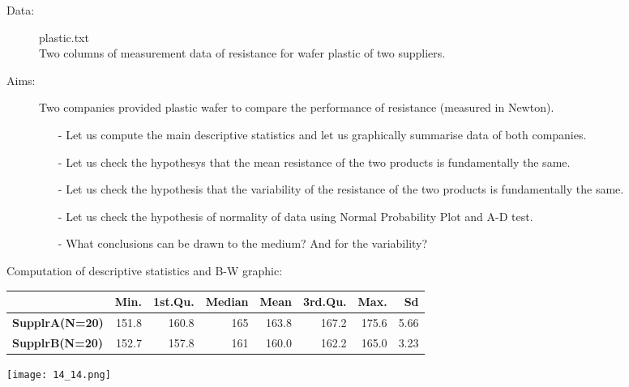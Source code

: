\begin{frame} 
  \begin{description}
    \item[Data:] plastic.txt\\ 
      Two columns of measurement data of resistance for wafer plastic of two suppliers.
    \item[Aims:] 
      \begin{small}
        Two companies provided plastic wafer to compare the performance of resistance (measured in Newton).
        \begin{itemize}
          \item[-] Let us compute the main descriptive statistics and let us graphically summarise data of both companies.
          \item[-] Let us check the hypothesys that the mean resistance of the two products is fundamentally the same.
          \item[-] Let us check the hypothesis that the variability of the resistance of the two products is fundamentally the same.
          \item[-] Let us check the hypothesis of normality of data using Normal Probability Plot and A-D test. 
          \item[-] What conclusions can be drawn to the medium? And for the variability?
        \end{itemize}
      \end{small}
  \end{description}
\end{frame}

\begin{frame}
  Computation of descriptive statistics and B-W graphic:\\
  \vspace{.3cm}
  \begin{scriptsize}
    \begin{tabular}{|l|rrrrrrr|}
      \hline
      & \textbf{Min}. & 1\textbf{st.Qu}. & \textbf{Median} & \textbf{Mean} & \textbf{3rd.Qu.} & \textbf{Max.} & \textbf{Sd}\\
      \hline
      \textbf{SupplrA(N=20)} & 151.8 & 160.8 & 165 & 163.8 & 167.2 & 175.6 & 5.66\\
      \textbf{SupplrB(N=20)} & 152.7 & 157.8 & 161 & 160.0 & 162.2 & 165.0 & 3.23\\
      \hline	
    \end{tabular}
  \end{scriptsize}
  \begin{center}
    \texttt{[image: 14\_14.png]}
  \end{center}
\end{frame}

